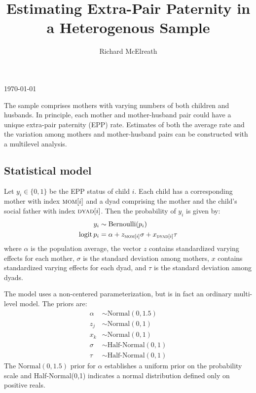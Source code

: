 \documentclass[reqno ,12pt]{amsart}
\DeclareMathOperator{\logit}{logit}
\newcommand{\mr}{\mathrm}
\begin{document}
\title{Estimating Extra-Pair Paternity in a Heterogenous Sample}
\author{Richard McElreath}
\address{Department of Human Behavior, Ecology and Culture, Max Planck Institute for Evolutionary Anthropology, Leipzig, Germany}


\maketitle

{\vspace{-6pt}\footnotesize\begin{center}\today\end{center}\vspace{12pt}}

\linenumbers
\modulolinenumbers[3]




The sample comprises mothers with varying numbers of both children and husbands. In principle, each mother and mother-husband pair could have a unique extra-pair paternity (EPP) rate. Estimates of both the average rate and the variation among mothers and mother-husband pairs can be constructed with a multilevel analysis.

\subsection*{Statistical model}

Let $y_i \in \{0,1\}$ be the EPP status of child $i$. Each child has a corresponding mother with index $\textsc{mom}[i]$ and a dyad comprising the mother and the child's social father with index $\textsc{dyad}[i]$. Then the probability of $y_i$ is given by:
\begin{align*}
	y_i &\sim \mathrm{Bernoulli}(p_i)\\
	\logit p_i &= \alpha + z_{\textsc{mom}[i]} \sigma + x_{\textsc{dyad}[i]} \tau
\end{align*}
where $\alpha$ is the population average, the vector $z$ contains standardized varying effects for each mother, $\sigma$ is the standard deviation among mothers, $x$ contains standardized varying effects for each dyad, and $\tau$ is the standard deviation among dyads.

The model uses a non-centered parameterization, but is in fact an ordinary multi-level model. The priors are:
\begin{align*}
	\alpha &\sim \mr{Normal}(0,1.5)\\
	z_j &\sim \mr{Normal}(0,1)\\
	x_k &\sim \mr{Normal}(0,1)\\
	\sigma &\sim \text{Half-Normal}(0,1)\\
	\tau &\sim \text{Half-Normal}(0,1)
\end{align*}
The $\mr{Normal}(0,1.5)$ prior for $\alpha$ establishes a uniform prior on the probability scale and Half-Normal(0,1) indicates a normal distribution defined only on positive reals.
\end{document}
